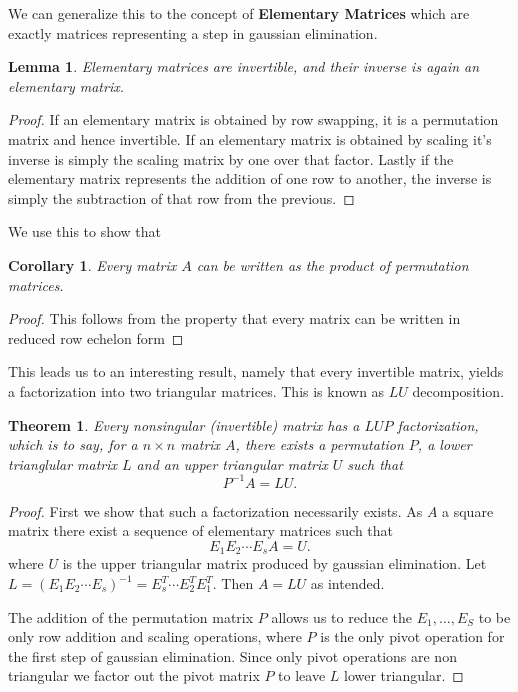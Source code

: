 \documentclass[12pt]{extarticle}
\newtheorem*{theorem}{Theorem}
\newtheorem*{corollary}{Corollary}
\newtheorem*{lemma}{Lemma}
\begin{document}
We can generalize this to the concept of \textbf{Elementary Matrices} which are exactly matrices representing a step in gaussian elimination. 

\begin{lemma}
  Elementary matrices are invertible, and their inverse is again an elementary matrix.
\end{lemma}

\begin{proof}
  If an elementary matrix is obtained by row swapping, it is a permutation matrix and hence invertible. If an elementary matrix is obtained by scaling it's inverse is simply the scaling matrix by one over that factor. Lastly if the elementary matrix represents the addition of one row to another, the inverse is simply the subtraction of that row from the previous. 
\end{proof}

We use this to show that 

\begin{corollary}
  Every matrix $A$ can be written as the product of permutation matrices.
\end{corollary}
\begin{proof}
  This follows from the property that every matrix can be written in reduced row echelon form 
\end{proof}

This leads us to an interesting result, namely that every invertible matrix, yields a factorization into two triangular matrices. This is known as $LU$ decomposition.

\begin{theorem}
  Every nonsingular (invertible) matrix has a $LUP$ factorization, which is to say, for a $n \times n$ matrix $A$, there exists a permutation $P$, a lower trianglular matrix $L$ and an upper triangular matrix $U$ such that 
  \[
    P^{-1} A = LU.
  \]
\end{theorem}
\begin{proof}
  First we show that such a factorization necessarily exists. As $A$ a square matrix there exist a sequence of elementary matrices such that 
  \[
    E_1 E_2 \cdots E_s A =  U.
  \]
  where $U$ is the upper triangular matrix produced by gaussian elimination. Let $L = (E_1E_2\cdots E_s)^{-1} = E_s^T\cdots E_2^TE_1^T$. Then $A = LU$ as intended.
  
  The addition of the permutation matrix $P$ allows us to reduce the $E_1, \dots, E_S$ to be only row addition and scaling operations, where $P$ is the only pivot operation for the first step of gaussian elimination. Since only pivot operations are non triangular we factor out the pivot matrix $P$ to leave $L$ lower triangular.
\end{proof}
\end{document}
